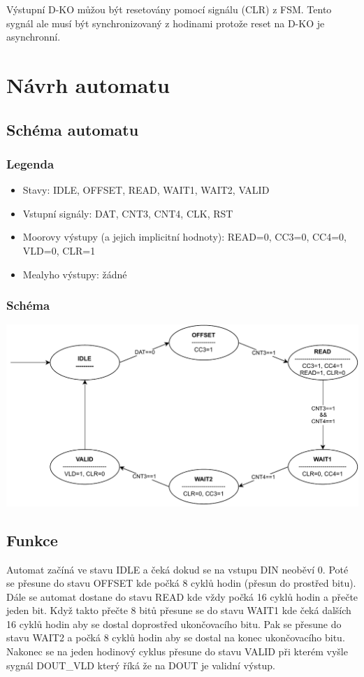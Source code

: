 \documentclass{article}
\begin{document}
Výstupní D-KO můžou být resetovány pomocí signálu (CLR) z FSM. Tento sygnál ale
musí být synchronizovaný z hodinami protože reset na D-KO je asynchronní.

\newpage

\section{Návrh automatu}

\subsection{Schéma automatu}

\subsubsection{Legenda}

\begin{itemize}
    \item Stavy: IDLE, OFFSET, READ, WAIT1, WAIT2, VALID
    \item Vstupní signály: DAT, CNT3, CNT4, CLK, RST
    \item Moorovy výstupy (a jejich implicitní hodnoty): READ=0, CC3=0, CC4=0,
          VLD=0, CLR=1
    \item Mealyho výstupy: žádné
\end{itemize}

\subsubsection{Schéma}

\includegraphics*[scale=0.9]{assets/FSM.pdf}

\subsection{Funkce}
Automat začíná ve stavu IDLE a čeká dokud se na vstupu DIN neoběví 0. Poté se
přesune do stavu OFFSET kde počká 8 cyklů hodin (přesun do prostřed bitu). Dále
se automat dostane do stavu READ kde vždy počká 16 cyklů hodin a přečte jeden
bit. Když takto přečte 8 bitů přesune se do stavu WAIT1 kde čeká dalších 16
cyklů hodin aby se dostal doprostřed ukončovacího bitu. Pak se přesune do stavu
WAIT2 a počká 8 cyklů hodin aby se dostal na konec ukončovacího bitu. Nakonec
se na jeden hodinový cyklus přesune do stavu VALID při kterém vyšle sygnál
DOUT\_VLD který říká že na DOUT je validní výstup.
\end{document}

